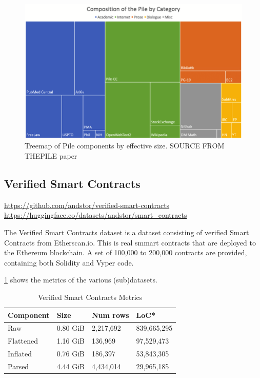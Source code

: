 \begin{figure}[htp]
    \centering
    \includegraphics[width=\textwidth]{figures/Treemap-of-Pile-components-by-effective-size.png}
    \caption{Treemap of Pile components by effective size. SOURCE FROM THEPILE paper}
    \label{fig:flowchart}
\end{figure}


\subsection{Verified Smart Contracts}
\label{sec:verified-smart-contracts}
\url{https://github.com/andstor/verified-smart-contracts}
\url{https://huggingface.co/datasets/andstor/smart_contracts}

The Verified Smart Contracts dataset is a dataset consisting of verified Smart Contracts from Etherscan.io. This is real smmart contracts that are deployed to the Ethereum blockchain. A set of 100,000 to 200,000 contracts are provided, containing both Solidity and Vyper code.

\cref{tab:verified-smart-contracts-metrics} shows the metrics of the various (sub)datasets.

\begin{table}
    \def\arraystretch{1.5}
    \small
    \centering
    \caption{Verified Smart Contracts Metrics}
    \label{tab:verified-smart-contracts-metrics}
    \begin{tabularx}{\textwidth}{XXXX}
        \toprule
        \textbf{Component} & \textbf{Size} &  \textbf{Num rows} & \textbf{LoC*}\\
        \midrule
        Raw & 0.80 GiB & 2,217,692 & 839,665,295\\
        Flattened & 1.16 GiB & 136,969 & 97,529,473\\
        Inflated & 0.76 GiB & 186,397 & 53,843,305\\
        Parsed & 4.44 GiB & 4,434,014 & 29,965,185\\
        \bottomrule
    \end{tabularx}
\end{table}

